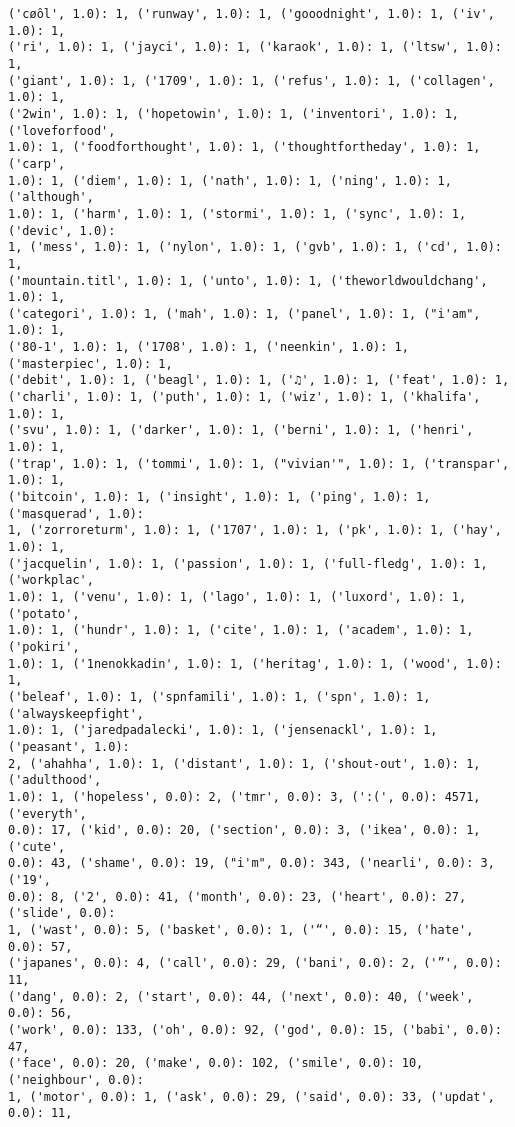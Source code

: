 \documentclass[11pt]{article}
\begin{document}
\begin{Verbatim}[commandchars=\\\{\}]
('cøôl', 1.0): 1, ('runway', 1.0): 1, ('gooodnight', 1.0): 1, ('iv', 1.0): 1,
('ri', 1.0): 1, ('jayci', 1.0): 1, ('karaok', 1.0): 1, ('ltsw', 1.0): 1,
('giant', 1.0): 1, ('1709', 1.0): 1, ('refus', 1.0): 1, ('collagen', 1.0): 1,
('2win', 1.0): 1, ('hopetowin', 1.0): 1, ('inventori', 1.0): 1, ('loveforfood',
1.0): 1, ('foodforthought', 1.0): 1, ('thoughtfortheday', 1.0): 1, ('carp',
1.0): 1, ('diem', 1.0): 1, ('nath', 1.0): 1, ('ning', 1.0): 1, ('although',
1.0): 1, ('harm', 1.0): 1, ('stormi', 1.0): 1, ('sync', 1.0): 1, ('devic', 1.0):
1, ('mess', 1.0): 1, ('nylon', 1.0): 1, ('gvb', 1.0): 1, ('cd', 1.0): 1,
('mountain.titl', 1.0): 1, ('unto', 1.0): 1, ('theworldwouldchang', 1.0): 1,
('categori', 1.0): 1, ('mah', 1.0): 1, ('panel', 1.0): 1, ("i'am", 1.0): 1,
('80-1', 1.0): 1, ('1708', 1.0): 1, ('neenkin', 1.0): 1, ('masterpiec', 1.0): 1,
('debit', 1.0): 1, ('beagl', 1.0): 1, ('♫', 1.0): 1, ('feat', 1.0): 1,
('charli', 1.0): 1, ('puth', 1.0): 1, ('wiz', 1.0): 1, ('khalifa', 1.0): 1,
('svu', 1.0): 1, ('darker', 1.0): 1, ('berni', 1.0): 1, ('henri', 1.0): 1,
('trap', 1.0): 1, ('tommi', 1.0): 1, ("vivian'", 1.0): 1, ('transpar', 1.0): 1,
('bitcoin', 1.0): 1, ('insight', 1.0): 1, ('ping', 1.0): 1, ('masquerad', 1.0):
1, ('zorroreturm', 1.0): 1, ('1707', 1.0): 1, ('pk', 1.0): 1, ('hay', 1.0): 1,
('jacquelin', 1.0): 1, ('passion', 1.0): 1, ('full-fledg', 1.0): 1, ('workplac',
1.0): 1, ('venu', 1.0): 1, ('lago', 1.0): 1, ('luxord', 1.0): 1, ('potato',
1.0): 1, ('hundr', 1.0): 1, ('cite', 1.0): 1, ('academ', 1.0): 1, ('pokiri',
1.0): 1, ('1nenokkadin', 1.0): 1, ('heritag', 1.0): 1, ('wood', 1.0): 1,
('beleaf', 1.0): 1, ('spnfamili', 1.0): 1, ('spn', 1.0): 1, ('alwayskeepfight',
1.0): 1, ('jaredpadalecki', 1.0): 1, ('jensenackl', 1.0): 1, ('peasant', 1.0):
2, ('ahahha', 1.0): 1, ('distant', 1.0): 1, ('shout-out', 1.0): 1, ('adulthood',
1.0): 1, ('hopeless', 0.0): 2, ('tmr', 0.0): 3, (':(', 0.0): 4571, ('everyth',
0.0): 17, ('kid', 0.0): 20, ('section', 0.0): 3, ('ikea', 0.0): 1, ('cute',
0.0): 43, ('shame', 0.0): 19, ("i'm", 0.0): 343, ('nearli', 0.0): 3, ('19',
0.0): 8, ('2', 0.0): 41, ('month', 0.0): 23, ('heart', 0.0): 27, ('slide', 0.0):
1, ('wast', 0.0): 5, ('basket', 0.0): 1, ('“', 0.0): 15, ('hate', 0.0): 57,
('japanes', 0.0): 4, ('call', 0.0): 29, ('bani', 0.0): 2, ('”', 0.0): 11,
('dang', 0.0): 2, ('start', 0.0): 44, ('next', 0.0): 40, ('week', 0.0): 56,
('work', 0.0): 133, ('oh', 0.0): 92, ('god', 0.0): 15, ('babi', 0.0): 47,
('face', 0.0): 20, ('make', 0.0): 102, ('smile', 0.0): 10, ('neighbour', 0.0):
1, ('motor', 0.0): 1, ('ask', 0.0): 29, ('said', 0.0): 33, ('updat', 0.0): 11,

\end{Verbatim}
\end{document}
